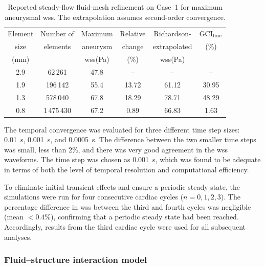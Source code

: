 \documentclass[12pt,a4paper]{article}
\newcommand{\cfdrevision}[1]{#1} %
\newcommand{\WSS}{\ac{wss}\xspace}
\theoremstyle{definition}
\numberwithin{equation}{section}
\providecommand{\DIFaddtex}[1]{{\protect\color{blue} \sf #1}} %
\providecommand{\DIFaddFL}[1]{\DIFadd{#1}} %
\providecommand{\DIFaddbeginFL}{} %
\providecommand{\DIFaddendFL}{} %
\providecommand{\DIFadd}[1]{\texorpdfstring{\DIFaddtex{#1}}{#1}} %
\newcommand{\DIFaddincludegraphics}[2][]{{\color{blue}\fbox{\DIFOincludegraphics[#1]{#2}}}} %
\DeclareRobustCommand{\DIFaddbeginFL}{\DIFOaddbeginFL \let\includegraphics\DIFaddincludegraphics} %
\DeclareRobustCommand{\DIFaddendFL}{\DIFOaddendFL \let\includegraphics\DIFOincludegraphics} %
\renewcommand{\DIFaddtex}[1]{{\protect\color{red}#1}}
\renewcommand{\DIFaddincludegraphics}[2][]{\DIFOincludegraphics[#1]{#2}}
\renewcommand{\cfdrevision}[1]{\textcolor{red}{#1}}
\def\DIFaddbeginFL{}\def\DIFaddendFL{}%
\def\cfdrevision#1{#1}%
\begin{document}
\begin{table}[ht!]
\centering
\setlength{\tabcolsep}{3.5pt}
\caption{Reported steady-flow fluid-mesh refinement \DIFaddbeginFL \DIFaddFL{\cfdrevision{on Case~1} }\DIFaddendFL for maximum aneurysmal \WSS. The extrapolation assumes second-order convergence.}
\label{tab:mesh_study}
\setlength{\tabcolsep}{7pt}
\begin{tabular}{cccccc}
\toprule
Element & Number of & Maximum & Relative & Richardson- & GCI$_{\rm fine}$ \\
size & elements & aneurysm & change & extrapolated & (\%) \\
(mm) & & \WSS (Pa) & (\%) & \WSS (Pa) & \\
\midrule
2.9 & 62\,261    & 47.8 & --    & --    & -- \\
1.9 & 196\,142   & 55.4 & 13.72 & 61.12 & 30.95 \\
1.3 & 578\,040   & 67.8 & 18.29 & 78.71 & 48.29 \\
0.8 & 1\,475\,430 & 67.2 & 0.89  & 66.83 & 1.63 \\
\bottomrule
\end{tabular}
\end{table}


The temporal convergence was evaluated for three different time step sizes: 0.01~s, 0.001~s, and 0.0005~s. The difference between the two smaller time steps was small, less than 2\%, and there was very good agreement in the \WSS waveforms. The time step was chosen as 0.001~s, which was found to be adequate in terms of both the level of temporal resolution and computational efficiency.

To eliminate initial transient effects and ensure a periodic steady state, the simulations were run for four consecutive cardiac cycles (\(n = 0,1,2,3\)). The percentage difference in \WSS between the third and fourth cycles was negligible (mean \(< 0.4\%\)), confirming that a periodic steady state had been reached. Accordingly, results from the third cardiac cycle were used for all subsequent analyses.



\subsubsection{Fluid--structure interaction model}
\end{document}
